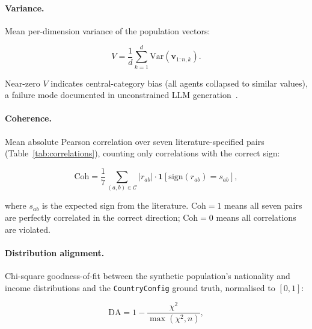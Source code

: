 \documentclass[sustainability,article,submit,pdftex,moreauthors]{Definitions/mdpi}
\begin{document}
\paragraph{Variance.}
Mean per-dimension variance of the population vectors:

\begin{linenomath}
\begin{equation}
  V = \frac{1}{d}\sum_{k=1}^{d} \mathrm{Var}(\mathbf{v}_{1:n,k}).
  \label{eq:variance}
\end{equation}
\end{linenomath}

Near-zero $V$ indicates central-category bias (all agents collapsed to
similar values), a failure mode documented in unconstrained LLM
generation~\cite{argyle2023outstuffing}.

\paragraph{Coherence.}
Mean absolute Pearson correlation over seven literature-specified pairs
(Table~\ref{tab:correlations}), counting only correlations with the
correct sign:

\begin{linenomath}
\begin{equation}
  \text{Coh} = \frac{1}{7}\sum_{(a,b) \in \mathcal{C}}
               |r_{ab}| \cdot \mathbf{1}[\mathrm{sign}(r_{ab}) = s_{ab}],
  \label{eq:coherence}
\end{equation}
\end{linenomath}

where $s_{ab}$ is the expected sign from the literature. $\text{Coh} = 1$
means all seven pairs are perfectly correlated in the correct direction;
$\text{Coh} = 0$ means all correlations are violated.

\paragraph{Distribution alignment.}
Chi-square goodness-of-fit between the synthetic population's nationality
and income distributions and the \texttt{CountryConfig} ground truth,
normalised to $[0,1]$:

\begin{linenomath}
\begin{equation}
  \text{DA} = 1 - \frac{\chi^2}{\max(\chi^2, n)},
  \label{eq:distribution_alignment}
\end{equation}
\end{linenomath}
\end{document}

